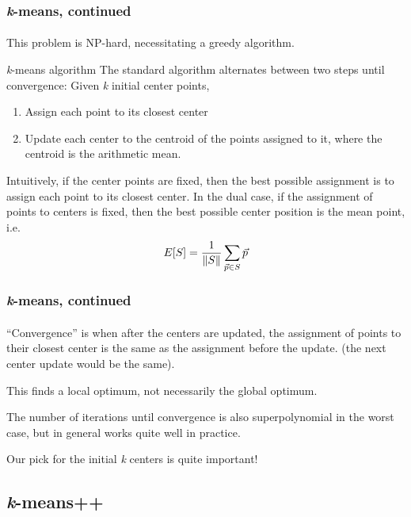 \documentclass{beamer}                             %
\begin{document}
\begin{frame}
\frametitle{\textit{k}-means, continued}
\framesubtitle{}
This problem is NP-hard, necessitating a greedy algorithm. \pause

\begin{block}{\textit{k}-means algorithm}
The standard algorithm alternates between two steps until convergence:
Given \textit{k} initial center points,
\begin{enumerate}[<+->]
  \item Assign each point to its closest center
  \item Update each center to the \alert{centroid} of the points assigned to it,
    where the centroid is the arithmetic mean.
\end{enumerate}

\end{block}

Intuitively, if the center points are fixed, then the best possible assignment
is to assign each point to its closest center. \pause
In the dual case, if the assignment of points to centers is fixed,
then the best possible center position is the mean point, i.e.
\[ E[S] = \frac{1}{\norm{S}} \sum_{\vec{p} \in S} \vec{p}  \]
\end{frame}

\begin{frame}
\frametitle{\textit{k}-means, continued}
\framesubtitle{}
\enquote{Convergence} is when after the centers are updated,
the assignment of points to their closest center 
is the same as the assignment before the update.
(the next center update would be the same). \pause

This finds a local optimum, not necessarily the global optimum. \pause

The number of iterations until convergence is also superpolynomial
in the worst case, but in general works quite well in practice.

Our pick for the initial \textit{k} centers is quite important!
\end{frame}

\subsection{\textit{k}-means++}
\end{document}
